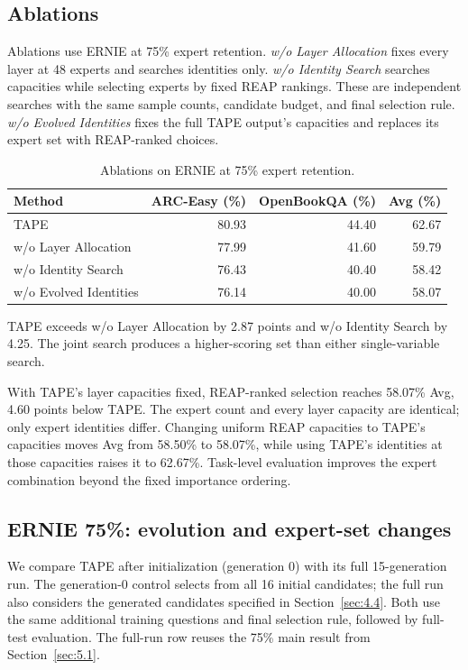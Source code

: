 \documentclass{article}
\begin{document}
\subsection{Ablations}
\label{sec:5.3}
Ablations use ERNIE at 75\% expert retention. \emph{w/o Layer Allocation} fixes every layer at 48 experts and searches identities only. \emph{w/o Identity Search} searches capacities while selecting experts by fixed REAP rankings. These are independent searches with the same sample counts, candidate budget, and final selection rule. \emph{w/o Evolved Identities} fixes the full TAPE output's capacities and replaces its expert set with REAP-ranked choices.

\begin{table}[htbp]
\centering\small
\caption{Ablations on ERNIE at 75\% expert retention.}
\label{tab:ablation}
\begin{tabularx}{\linewidth}{@{}Xrrr@{}}
\toprule
Method & ARC-Easy (\%) & OpenBookQA (\%) & Avg (\%) \\
\midrule
TAPE & 80.93 & 44.40 & 62.67 \\
w/o Layer Allocation & 77.99 & 41.60 & 59.79 \\
w/o Identity Search & 76.43 & 40.40 & 58.42 \\
w/o Evolved Identities & 76.14 & 40.00 & 58.07 \\
\bottomrule
\end{tabularx}
\end{table}

TAPE exceeds w/o Layer Allocation by 2.87 points and w/o Identity Search by 4.25. The joint search produces a higher-scoring set than either single-variable search.

With TAPE's layer capacities fixed, REAP-ranked selection reaches 58.07\% Avg, 4.60 points below TAPE. The expert count and every layer capacity are identical; only expert identities differ. Changing uniform REAP capacities to TAPE's capacities moves Avg from 58.50\% to 58.07\%, while using TAPE's identities at those capacities raises it to 62.67\%. Task-level evaluation improves the expert combination beyond the fixed importance ordering.

\subsection{ERNIE 75\%: evolution and expert-set changes}
\label{sec:5.4}
We compare TAPE after initialization (generation 0) with its full 15-generation run. The generation-0 control selects from all 16 initial candidates; the full run also considers the generated candidates specified in Section~\ref{sec:4.4}. Both use the same additional training questions and final selection rule, followed by full-test evaluation. The full-run row reuses the 75\% main result from Section~\ref{sec:5.1}.
\end{document}

